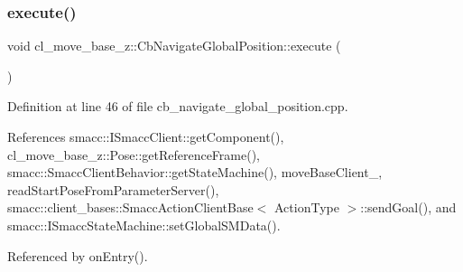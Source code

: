 \subsubsection{\texorpdfstring{execute()}{execute()}}
{\footnotesize\ttfamily void cl\+\_\+move\+\_\+base\+\_\+z\+::\+Cb\+Navigate\+Global\+Position\+::execute (\begin{DoxyParamCaption}{ }\end{DoxyParamCaption})}



Definition at line 46 of file cb\+\_\+navigate\+\_\+global\+\_\+position.\+cpp.



References smacc\+::\+I\+Smacc\+Client\+::get\+Component(), cl\+\_\+move\+\_\+base\+\_\+z\+::\+Pose\+::get\+Reference\+Frame(), smacc\+::\+Smacc\+Client\+Behavior\+::get\+State\+Machine(), move\+Base\+Client\+\_\+, read\+Start\+Pose\+From\+Parameter\+Server(), smacc\+::client\+\_\+bases\+::\+Smacc\+Action\+Client\+Base$<$ Action\+Type $>$\+::send\+Goal(), and smacc\+::\+I\+Smacc\+State\+Machine\+::set\+Global\+S\+M\+Data().



Referenced by on\+Entry().


